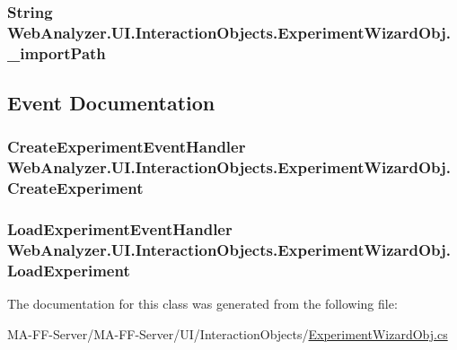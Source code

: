 \subsubsection[{\+\_\+import\+Path}]{\setlength{\rightskip}{0pt plus 5cm}String Web\+Analyzer.\+U\+I.\+Interaction\+Objects.\+Experiment\+Wizard\+Obj.\+\_\+import\+Path\hspace{0.3cm}{\ttfamily [private]}}\label{class_web_analyzer_1_1_u_i_1_1_interaction_objects_1_1_experiment_wizard_obj_ac39fd1cef0cdfe82f059db09b97cc0f2}


\subsection{Event Documentation}
\hypertarget{class_web_analyzer_1_1_u_i_1_1_interaction_objects_1_1_experiment_wizard_obj_a95676a614efb19092a4522290e47ef96}{}
\subsubsection[{Create\+Experiment}]{\setlength{\rightskip}{0pt plus 5cm}Create\+Experiment\+Event\+Handler Web\+Analyzer.\+U\+I.\+Interaction\+Objects.\+Experiment\+Wizard\+Obj.\+Create\+Experiment}\label{class_web_analyzer_1_1_u_i_1_1_interaction_objects_1_1_experiment_wizard_obj_a95676a614efb19092a4522290e47ef96}
\hypertarget{class_web_analyzer_1_1_u_i_1_1_interaction_objects_1_1_experiment_wizard_obj_a4ab54f4e59198b7ff3e9b91ad5049642}{}
\subsubsection[{Load\+Experiment}]{\setlength{\rightskip}{0pt plus 5cm}Load\+Experiment\+Event\+Handler Web\+Analyzer.\+U\+I.\+Interaction\+Objects.\+Experiment\+Wizard\+Obj.\+Load\+Experiment}\label{class_web_analyzer_1_1_u_i_1_1_interaction_objects_1_1_experiment_wizard_obj_a4ab54f4e59198b7ff3e9b91ad5049642}


The documentation for this class was generated from the following file\+:\begin{DoxyCompactItemize}
\item 
M\+A-\/\+F\+F-\/\+Server/\+M\+A-\/\+F\+F-\/\+Server/\+U\+I/\+Interaction\+Objects/\hyperlink{_experiment_wizard_obj_8cs}{Experiment\+Wizard\+Obj.\+cs}\end{DoxyCompactItemize}
